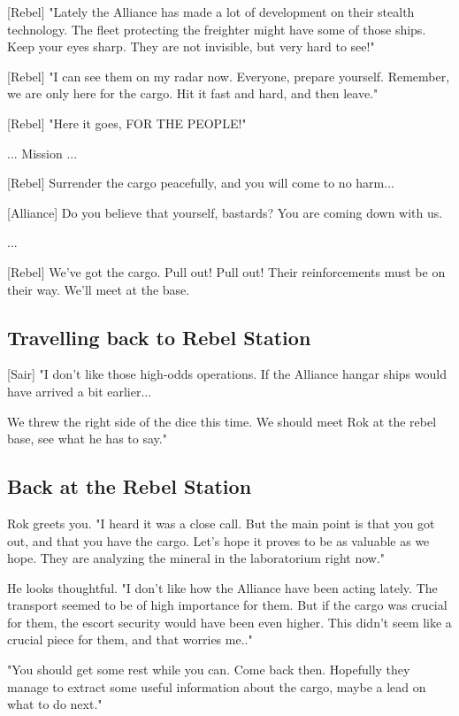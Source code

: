 \documentclass[a4paper,12pt]{article}
\begin{document}
[Rebel] "Lately the Alliance has made a lot of development on their stealth technology.
The fleet protecting the freighter might have some of those ships. Keep your eyes sharp.
They are not invisible, but very hard to see!"

[Rebel] "I can see them on my radar now. Everyone, prepare yourself. Remember, we are
only here for the cargo. Hit it fast and hard, and then leave."

[Rebel] "Here it goes, FOR THE PEOPLE!"

... Mission ...

[Rebel] Surrender the cargo peacefully, and you will come to no harm...

[Alliance] Do you believe that yourself, bastards? You are coming down with us.

...

[Rebel] We've got the cargo. Pull out! Pull out! Their reinforcements must be on their way.
We'll meet at the base.

\subsection{Travelling back to Rebel Station}

[Sair] "I don't like those high-odds operations. If the Alliance hangar ships would have
arrived a bit earlier...

We threw the right side of the dice this time. We should meet Rok at the rebel base, 
see what he has to say."

\subsection{Back at the Rebel Station}

Rok greets you. "I heard it was a close call. But the main point is that you got out, and
that you have the cargo. Let's hope it proves to be as valuable as we hope. They are analyzing
the mineral in the laboratorium right now."

He looks thoughtful. "I don't like how the Alliance have been acting lately. The transport seemed
to be of high importance for them. But if the cargo was crucial for them, the escort security
would have been even higher. This didn't seem like a crucial piece for them, and that worries me.."

"You should get some rest while you can. Come back then. Hopefully they manage to extract some
useful information about the cargo, maybe a lead on what to do next."
\end{document}
